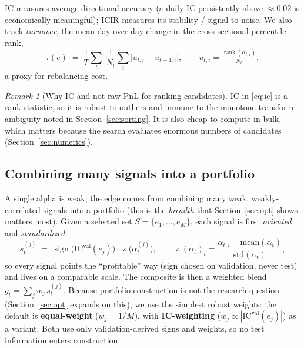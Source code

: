 \documentclass[11pt]{article}
\theoremstyle{definition}
\theoremstyle{plain}
\theoremstyle{remark}
\newtheorem{remark}{Remark}[section]
\newcommand{\IC}{\mathrm{IC}}
\newcommand{\ICIR}{\mathrm{ICIR}}
\newcommand{\sgn}{\operatorname{sign}}
\newcommand{\rank}{\operatorname{rank}}
\newcommand{\zscore}{\operatorname{z}}
\begin{document}
$\IC$ measures average directional accuracy (a daily $\IC$ persistently above
$\approx 0.02$ is economically meaningful); $\ICIR$ measures its stability /
signal-to-noise. We also track \emph{turnover}, the mean day-over-day change in the
cross-sectional percentile rank,
\begin{equation}
\tau(e) \;=\; \frac{1}{T}\sum_{t} \ \frac{1}{N_t}\sum_i \big| u_{t,i} - u_{t-1,i}\big|,
\qquad u_{t,i} = \tfrac{\rank(\alpha_{t,i})}{N_t},
\label{eq:turnover}
\end{equation}
a proxy for rebalancing cost.

\begin{remark}[Why IC and not raw PnL for ranking candidates]
$\IC$ in \eqref{eq:ic} is a rank statistic, so it is robust to outliers and immune to
the monotone-transform ambiguity noted in Section~\ref{sec:sorting}. It is also cheap
to compute in bulk, which matters because the search evaluates enormous numbers of
candidates (Section~\ref{sec:numerics}).
\end{remark}

\subsection{Combining many signals into a portfolio}
\label{sec:combine}

A single alpha is weak; the edge comes from combining many weak,
weakly-correlated signals into a portfolio (this is the \emph{breadth} that
Section~\ref{sec:opt} shows matters most). Given a selected set $S=\{e_1,\dots,e_M\}$,
each signal is first \emph{oriented} and \emph{standardized}:
\begin{equation}
s^{(j)}_t \;=\; \sgn\!\big(\IC^{\text{val}}(e_j)\big)\cdot \zscore\!\big(\alpha^{(j)}_t\big),
\qquad
\zscore(\alpha_t)_i = \frac{\alpha_{t,i}-\mathrm{mean}(\alpha_t)}{\mathrm{std}(\alpha_t)},
\label{eq:orient}
\end{equation}
so every signal points the ``profitable'' way (sign chosen on validation, never test) and
lives on a comparable scale. The composite is then a weighted blend
$g_t = \sum_j w_j\, s^{(j)}_t$. Because portfolio construction is not the research question
(Section~\ref{sec:opt} expands on this), we use the simplest robust weights: the default is
\textbf{equal-weight} ($w_j = 1/M$), with \textbf{IC-weighting}
($w_j \propto |\IC^{\text{val}}(e_j)|$) as a variant. Both use only validation-derived signs
and weights, so no test information enters construction.
\end{document}

